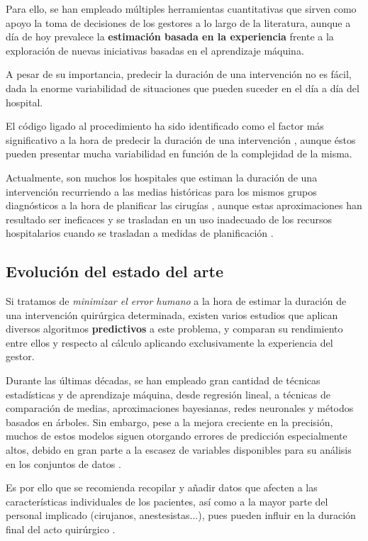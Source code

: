 Para ello, se han empleado múltiples herramientas cuantitativas que sirven como apoyo la toma de decisiones de los gestores a lo largo de la literatura, aunque a día de hoy prevalece la \textbf{estimación basada en la experiencia} \cite{Brailsford2011ORPerspective} frente a la exploración de nuevas iniciativas basadas en el aprendizaje máquina. 

A pesar de su importancia, predecir la duración de una intervención no es fácil, dada la enorme variabilidad de situaciones que pueden suceder en el día a día del hospital.

El código ligado al procedimiento ha sido identificado como el factor más significativo a la hora de predecir la duración de una intervención \cite{ShahabiKargar2014PredictingSurgery} , aunque éstos pueden presentar mucha variabilidad en función de la complejidad de la misma.

Actualmente, son muchos los hospitales que estiman la duración de una intervención recurriendo a las medias históricas para los mismos grupos diagnósticos a la hora de planificar las cirugías\cite{Wright1996StatisticalTime} , aunque estas aproximaciones han resultado ser ineficaces y se trasladan en un uso inadecuado de los recursos hospitalarios cuando se trasladan a medidas de planificación \cite{ShahabiKargar2014PredictingSurgery}.

\subsection{Evolución del estado del arte}

Si tratamos de \textit{minimizar el error humano} a la hora de estimar la duración de una intervención quirúrgica determinada, existen varios estudios que aplican diversos algoritmos \textbf{predictivos} a este problema, y comparan su rendimiento entre ellos y respecto al cálculo aplicando exclusivamente la experiencia del gestor.

Durante las últimas décadas, se han empleado gran cantidad de técnicas estadísticas y de aprendizaje máquina, desde regresión lineal, a técnicas de comparación de medias, aproximaciones bayesianas, redes neuronales y métodos basados en árboles.
Sin embargo, pese a la mejora creciente en la precisión, muchos de estos modelos siguen otorgando errores de predicción especialmente altos, debido en gran parte a la escasez de variables disponibles para su análisis en los conjuntos de datos \cite{ShahabiKargar2014PredictingSurgery}.

Es por ello que se recomienda recopilar y añadir datos que afecten a las características individuales de los pacientes, así como a la mayor parte del personal implicado (cirujanos, anestesistas...), pues pueden influir en la duración final del acto quirúrgico \cite{Wright1996StatisticalTime}.

